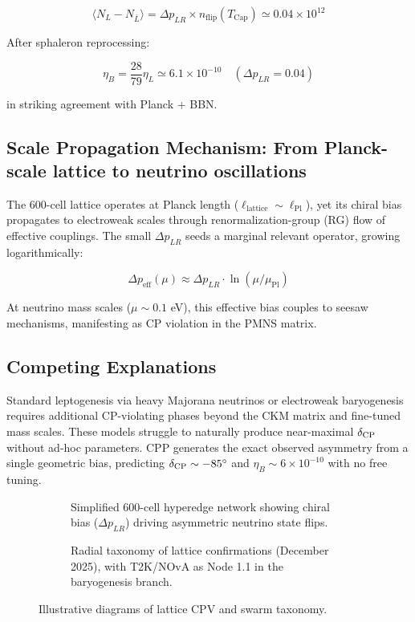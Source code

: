 \documentclass[11pt]{article}
\begin{document}
\[
\langle N_L - N_{\bar L} \rangle = \Delta p_{LR} \times n_{\text{flip}}(T_{\text{Cap}}) \simeq 0.04 \times 10^{12}
\]

After sphaleron reprocessing:

\[
\eta_B = \frac{28}{79} \eta_L \simeq 6.1 \times 10^{-10} \quad (\Delta p_{LR} = 0.04)
\]

in striking agreement with Planck + BBN.

\subsection{Scale Propagation Mechanism: From Planck-scale lattice to neutrino oscillations}
The 600-cell lattice operates at Planck length ($\ell_{\text{lattice}} \sim \ell_{\text{Pl}}$), yet its chiral bias propagates to electroweak scales through renormalization-group (RG) flow of effective couplings. The small $\Delta p_{LR}$ seeds a marginal relevant operator, growing logarithmically:

\[
\Delta p_{\text{eff}}(\mu) \approx \Delta p_{LR} \cdot \ln(\mu / \mu_{\text{Pl}})
\]

At neutrino mass scales ($\mu \sim 0.1$ eV), this effective bias couples to seesaw mechanisms, manifesting as CP violation in the PMNS matrix.

\subsection{Competing Explanations}
Standard leptogenesis via heavy Majorana neutrinos or electroweak baryogenesis requires additional CP-violating phases beyond the CKM matrix and fine-tuned mass scales. These models struggle to naturally produce near-maximal $\delta_{\rm CP}$ without ad-hoc parameters. CPP generates the exact observed asymmetry from a single geometric bias, predicting $\delta_{\rm CP} \sim -85^\circ$ and $\eta_B \sim 6 \times 10^{-10}$ with no free tuning.

\begin{figure}[htbp]
\centering
\begin{subfigure}{0.45\textwidth}
\centering
\caption{Simplified 600-cell hyperedge network showing chiral bias ($\Delta p_{LR}$) driving asymmetric neutrino state flips.}
\label{fig:hyperedge-cpv}
\end{subfigure}
\hfill
\begin{subfigure}{0.45\textwidth}
\centering
\caption{Radial taxonomy of lattice confirmations (December 2025), with T2K/NOvA as Node 1.1 in the baryogenesis branch.}
\label{fig:taxonomy}
\end{subfigure}
\caption{Illustrative diagrams of lattice CPV and swarm taxonomy.}
\end{figure}
\end{document}
